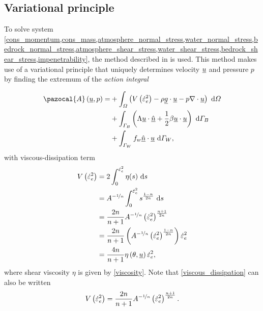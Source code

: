 \subsection{Variational principle} \label{ssn_full_stokes_var_prin}

To solve system \cref{cons_momentum,cons_mass,atmosphere_normal_stress,water_normal_stress,bedrock_normal_stress,atmosphere_shear_stress,water_shear_stress,bedrock_shear_stress,impenetrability}, the method described in \citet{dukowicz_2010} is used.
This method makes use of a variational principle that uniquely determines velocity $\underline{u}$ and pressure $p$ by finding the extremum of the \emph{action integral}

\begin{align}
  \label{action}
  \pazocal{A} \left(\rankone{u}, p\right) = &+ \int_{\Omega} \left( V\left( \dot{\varepsilon}_e^2 \right) - \rho \rankone{g} \cdot \rankone{u} - p \nabla \cdot \rankone{u} \right) \d{\Omega} \notag \\
  &+ \int_{\Gamma_B} \left( \Lambda \rankone{u} \cdot \normal + \frac{1}{2} \beta \rankone{u} \cdot \rankone{u} \right) \d{\Gamma_B} \notag \\
  &+ \int_{\Gamma_W} f_w \normal \cdot \rankone{u} \d{\Gamma_W},
\end{align}
with viscous-dissipation term
\begin{align}
  \label{viscous_dissipation}
  V\left( \dot{\varepsilon}_e^2 \right) &= 2 \int_0^{\dot{\varepsilon}_e^2} \eta(s) \ \mathrm{d}s \notag \\
  &= A^{-\nicefrac{1}{n}} \int_0^{\dot{\varepsilon}_e^2} s^{\frac{1-n}{2n}} \ \mathrm{d}s \notag \\
  &= \frac{2n}{n+1} A^{-\nicefrac{1}{n}} \left( \dot{\varepsilon}_e^2 \right)^{\frac{n+1}{2n}} \notag \\
  &= \frac{2n}{n+1} \left( A^{-\nicefrac{1}{n}} \left( \dot{\varepsilon}_e^2 \right)^{\frac{1-n}{2n}} \right) \dot{\varepsilon}_e^2 \notag \\
  &= \frac{4n}{n+1} \eta\left(\theta, \underline{u} \right) \dot{\varepsilon}_e^2,
\end{align}
where shear viscosity $\eta$ is given by \cref{viscosity}.
Note that \cref{viscous_dissipation} can also be written
\begin{align*}
  V\left( \dot{\varepsilon}_e^2 \right) = \frac{2n}{n+1} A^{-\nicefrac{1}{n}} \left( \dot{\varepsilon}_e^2 \right)^{\frac{n+1}{2n}}.
\end{align*}

